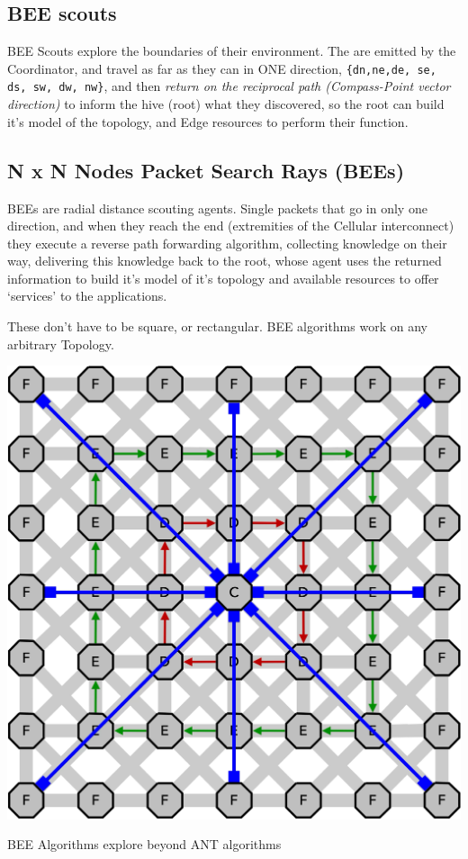 \subsection{BEE scouts}

BEE Scouts explore the boundaries of their environment.  The are emitted by the Coordinator, and travel as far as they can in ONE direction, \texttt{\{dn,ne,de, se, ds, sw, dw, nw\}}, and then \emph{return on the reciprocal path (Compass-Point vector direction)} to inform the hive (root) what they discovered, so the root can build it's model of the topology, and Edge resources to perform their function. 

\subsection{N x N Nodes Packet Search Rays (BEEs)}

BEEs  are radial distance scouting agents. Single packets that go in only one direction, and when they reach the end (extremities of the Cellular interconnect) they execute a reverse path forwarding algorithm, collecting knowledge on their way, delivering this knowledge back to the root, whose agent  uses the returned information to build it's model of it's topology and available resources to offer `services' to the applications.

These don't have to be square, or rectangular. BEE algorithms work on any arbitrary Topology.

 \begin{marginfigure}
        \includegraphics[width=\linewidth,trim=0mm 0mm 0mm 0mm, clip]{../../FIGURES/7x7-rays.pdf} %
  \caption{BEE Algorithms explore beyond ANT algorithms}
    \vspace{20pt}
\end{marginfigure}

